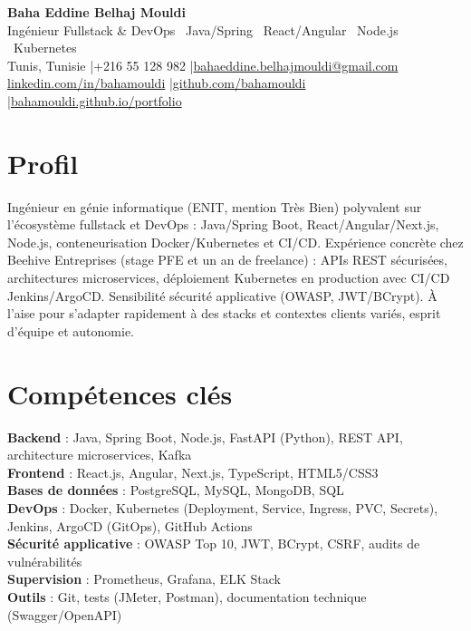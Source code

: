 \documentclass[a4paper,9pt]{article}
\begin{document}
\begin{center}
{\LARGE\bfseries\color{navy} Baha Eddine Belhaj Mouldi}\\[2pt]
{\normalsize\color{navy} Ingénieur Fullstack \& DevOps \textbar\ Java/Spring \textbar\ React/Angular \textbar\ Node.js \textbar\ Kubernetes}\\[3pt]
{\small Tunis, Tunisie \quad|\quad +216 55 128 982 \quad|\quad \href{mailto:bahaeddine.belhajmouldi@gmail.com}{bahaeddine.belhajmouldi@gmail.com}}\\[1pt]
{\small \href{https://www.linkedin.com/in/bahamouldi}{linkedin.com/in/bahamouldi} \quad|\quad \href{https://github.com/bahamouldi} {github.com/bahamouldi} \quad|\quad \href{https://bahamouldi.github.io/portfolio/}{bahamouldi.github.io/portfolio}}
\end{center}
\vspace{1pt}
\section{Profil}
Ingénieur en génie informatique (ENIT, mention Très Bien) polyvalent sur l'écosystème fullstack et DevOps : Java/Spring Boot, React/Angular/Next.js, Node.js, conteneurisation Docker/Kubernetes et CI/CD. Expérience concrète chez Beehive Entreprises (stage PFE et un an de freelance) : APIs REST sécurisées, architectures microservices, déploiement Kubernetes en production avec CI/CD Jenkins/ArgoCD. Sensibilité sécurité applicative (OWASP, JWT/BCrypt). À l'aise pour s'adapter rapidement à des stacks et contextes clients variés, esprit d'équipe et autonomie.
\section{Compétences clés}
\textbf{Backend} : Java, Spring Boot, Node.js, FastAPI (Python), REST API, architecture microservices, Kafka\\[0.3pt]
\textbf{Frontend} : React.js, Angular, Next.js, TypeScript, HTML5/CSS3\\[0.3pt]
\textbf{Bases de données} : PostgreSQL, MySQL, MongoDB, SQL\\[0.3pt]
\textbf{DevOps} : Docker, Kubernetes (Deployment, Service, Ingress, PVC, Secrets), Jenkins, ArgoCD (GitOps), GitHub Actions\\[0.3pt]
\textbf{Sécurité applicative} : OWASP Top 10, JWT, BCrypt, CSRF, audits de vulnérabilités\\[0.3pt]
\textbf{Supervision} : Prometheus, Grafana, ELK Stack\\[0.3pt]
\textbf{Outils} : Git, tests (JMeter, Postman), documentation technique (Swagger/OpenAPI)
\end{document}
